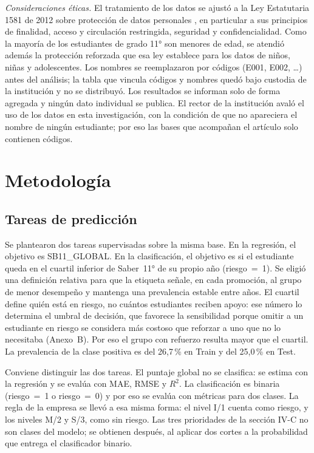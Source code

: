 \documentclass[10pt,letterpaper,twocolumn]{article}
\newcommand{\parencite}{\citep}
\begin{document}
\textit{Consideraciones éticas.} El tratamiento de los datos se ajustó a la Ley Estatutaria 1581 de 2012 sobre protección de datos personales \parencite{ley1581}, en particular a sus principios de finalidad, acceso y circulación restringida, seguridad y confidencialidad. Como la mayoría de los estudiantes de grado 11° son menores de edad, se atendió además la protección reforzada que esa ley establece para los datos de niños, niñas y adolescentes. Los nombres se reemplazaron por códigos (E001, E002, \ldots) antes del análisis; la tabla que vincula códigos y nombres quedó bajo custodia de la institución y no se distribuyó. Los resultados se informan solo de forma agregada y ningún dato individual se publica. El rector de la institución avaló el uso de los datos en esta investigación, con la condición de que no apareciera el nombre de ningún estudiante; por eso las bases que acompañan el artículo solo contienen códigos.

\section{Metodología}

\subsection{Tareas de predicción}

Se plantearon dos tareas supervisadas sobre la misma base. En la regresión, el objetivo es SB11\_GLOBAL. En la clasificación, el objetivo es si el estudiante queda en el cuartil inferior de Saber~11° de su propio año (riesgo~=~1). Se eligió una definición relativa para que la etiqueta señale, en cada promoción, al grupo de menor desempeño y mantenga una prevalencia estable entre años. El cuartil define quién está en riesgo, no cuántos estudiantes reciben apoyo: ese número lo determina el umbral de decisión, que favorece la sensibilidad porque omitir a un estudiante en riesgo se considera más costoso que reforzar a uno que no lo necesitaba (Anexo~B). Por eso el grupo con refuerzo resulta mayor que el cuartil. La prevalencia de la clase positiva es del 26,7\,\% en Train y del 25,0\,\% en Test.

Conviene distinguir las dos tareas. El puntaje global no se clasifica: se estima con la regresión y se evalúa con MAE, RMSE y $R^2$. La clasificación es binaria (riesgo~=~1 o riesgo~=~0) y por eso se evalúa con métricas para dos clases. La regla de la empresa se llevó a esa misma forma: el nivel I/1 cuenta como riesgo, y los niveles M/2 y S/3, como sin riesgo. Las tres prioridades de la sección IV-C no son clases del modelo; se obtienen después, al aplicar dos cortes a la probabilidad que entrega el clasificador binario.
\end{document}
